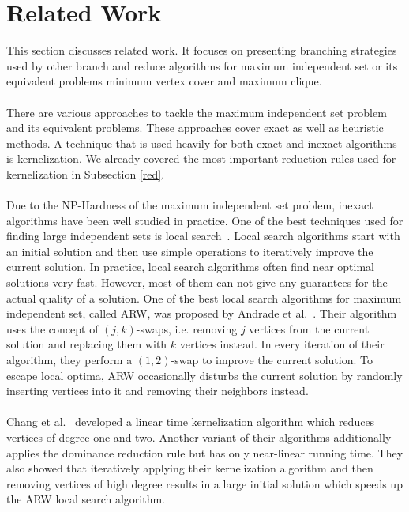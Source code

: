\documentclass[]{article}
\begin{document}
\newpage
\section{Related Work} \label{sec3}

This section discusses related work. It focuses on presenting branching strategies used by other branch and reduce algorithms for maximum independent set or its equivalent problems minimum vertex cover and maximum clique.\paragraph{}

There are various approaches to tackle the maximum independent set problem and its equivalent problems. These approaches cover exact as well as heuristic methods. A technique that is used heavily for both exact and inexact algorithms is kernelization. We already covered the most important reduction rules used for kernelization in Subsection \ref{red}.

\paragraph{}
 Due to the NP-Hardness of the maximum independent set problem, inexact algorithms have been well studied in practice. One of the best techniques used for finding large independent sets is local search~\cite{bibid}. Local search algorithms start with an initial solution and then use simple operations to iteratively improve the current solution. In practice, local search algorithms often find near optimal solutions very fast. However, most of them can not give any guarantees for the actual quality of a solution. One of the best local search algorithms for maximum independent set, called ARW, was proposed by Andrade et al.~\cite{bibid}. Their algorithm uses the concept of $(j,k)$-swaps, i.e. removing $j$ vertices from the current solution and replacing them with $k$ vertices instead. In every iteration of their algorithm, they perform a $(1,2)$-swap to improve the current solution. To escape local optima, ARW occasionally disturbs the current solution by randomly inserting vertices into it and removing their neighbors instead.

\paragraph{}
Chang et al.~\cite{bibid} developed a linear time kernelization algorithm which reduces vertices of degree one and two. Another variant of their algorithms additionally applies the dominance reduction rule but has only near-linear running time. They also showed that iteratively applying their kernelization algorithm and then removing vertices of high degree results in a large initial solution which speeds up the ARW local search algorithm.
\end{document}
